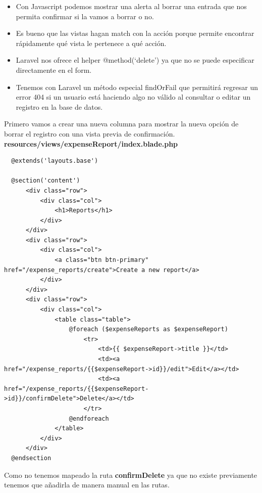 \documentclass{article}
\begin{document}
\begin{itemize}
  \item Con Javascript podemos mostrar una alerta al borrar una entrada que nos
    permita confirmar si la vamos a borrar o no.
  \item Es bueno que las vistas hagan match con la acción porque permite
    encontrar rápidamente qué vista le pertenece a qué acción.
  \item Laravel nos ofrece el helper @method(‘delete’) ya que no se puede
    especificar directamente en el form.
  \item Tenemos con Laravel un método especial findOrFail que permitirá
    regresar un error 404 si un usuario está haciendo algo no válido al
    consultar o editar un registro en la base de datos.
\end{itemize}

Primero vamos a crear una nueva columna para mostrar la nueva opción de borrar
el registro con una vista previa de confirmación.\\

\textbf{resources/views/expenseReport/index.blade.php}
\begin{verbatim}
  @extends('layouts.base')

  @section('content')
      <div class="row">
          <div class="col">
              <h1>Reports</h1>
          </div>
      </div>
      <div class="row">
          <div class="col">
              <a class="btn btn-primary" href="/expense_reports/create">Create a new report</a>
          </div>
      </div>
      <div class="row">
          <div class="col">
              <table class="table">
                  @foreach ($expenseReports as $expenseReport)
                      <tr>
                          <td>{{ $expenseReport->title }}</td>
                          <td><a href="/expense_reports/{{$expenseReport->id}}/edit">Edit</a></td>
                          <td><a href="/expense_reports/{{$expenseReport->id}}/confirmDelete">Delete</a></td>
                      </tr>
                  @endforeach
              </table>
          </div>
      </div>
  @endsection
\end{verbatim}

Como no tenemos mapeado la ruta \textbf{confirmDelete} ya que no existe
previamente tenemos que añadirla de manera manual en las rutas.\\
\end{document}
